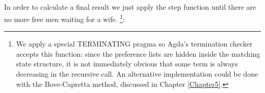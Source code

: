 {\begin{code}
\>[0]%
\>[885I]\AgdaSymbol{(}\AgdaSpace{}%
\AgdaSpace{}%
\AgdaSymbol{((}\AgdaSpace{}%
\AgdaOperator{\AgdaInductiveConstructor{,}}\AgdaSpace{}%
\AgdaSpace{}%
\AgdaSpace{}%
\AgdaSymbol{)}\AgdaSpace{}%
\AgdaSpace{}%
\AgdaSymbol{)}\AgdaSpace{}%
\AgdaSpace{}%
\AgdaSpace{}%
\AgdaSpace{}%
\AgdaSpace{}%
\AgdaSymbol{)}\<%
\\
\>[.][@{}l@{}]\<[885I]%
\>[5]\AgdaSymbol{|}\AgdaSpace{}%
\<%
\\
%
\>[5]\AgdaSymbol{=}\AgdaSpace{}%
%
\>[901I]\AgdaSpace{}%
\AgdaSpace{}%
\AgdaSymbol{((}\AgdaSpace{}%
\AgdaOperator{\AgdaInductiveConstructor{,}}\AgdaSpace{}%
\AgdaSymbol{)}\AgdaSpace{}%
\AgdaSpace{}%
\AgdaSymbol{)}\AgdaSpace{}%
\<%
\\
\>[.][@{}l@{}]\<[901I]%
\>[15]\AgdaSymbol{(}\AgdaSpace{}%
\AgdaSymbol{(}\AgdaSpace{}%
\AgdaOperator{\AgdaInductiveConstructor{,}}\AgdaSpace{}%
\AgdaSymbol{)}\AgdaSpace{}%
\AgdaSymbol{)}\<%
\\
%
\>[15]\AgdaSymbol{(}\AgdaSpace{}%
\AgdaSpace{}%
\AgdaSymbol{((}\AgdaSpace{}%
\AgdaOperator{\AgdaInductiveConstructor{,}}\AgdaSpace{}%
\AgdaSymbol{)}\AgdaSpace{}%
\AgdaSpace{}%
\AgdaSymbol{))}\AgdaSpace{}%
\<%
\end{code}

In order to calculate a final result we just apply the step function until there are no more free men waiting for a wife. \footnote{We apply a special TERMINATING pragma so Agda's termination checker accepts this function: since the preference lists are hidden inside the matching state structure, it is not immediately obvious that some term is always decreasing in the recursive call. An alternative implementation could be done with the Bove-Capretta method, discussed in Chapter \ref{Chapter5}.}:

}
